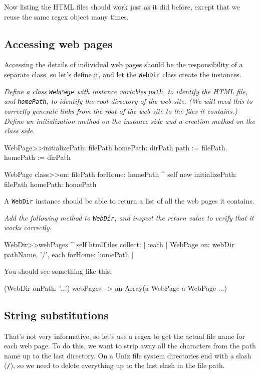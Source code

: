 \documentclass[10pt,twoside,chapterprefix=false]{scrbook}
\newcommand{\highlight}[1]{\textcolor{blue!65}{#1}}
\newcommand{\MarginLabel}[1]{%
	\marginnote{\textbf{#1}}}
\newcommand{\vartriangleout}{\ifthenelse{\isodd{\thepage}}{\vartriangleright}{\vartriangleleft}}
\renewcommand{\dothis}[1]{%
	\noindent\par\noindent
	{\reversemarginpar
		\marginnote{\fcolorbox{blue!65}{white}{\highlight{$\vartriangleout$}}}}
	\noindent\emph{#1}
	\nopagebreak}
\renewcommand{\ct}{\lstinline[mathescape=false,basicstyle={\sffamily\upshape}]}
\begin{document}
Now listing the HTML files should work just as it did before, except
that we reuse the same regex object many times.

\subsection{Accessing web pages}

Accessing the details of individual web pages should be the
responsibility of a separate class, so let's define it, and let the
\ct{WebDir} class create the instances.

\dothis{Define a class \ct{WebPage} with instance variables \ct{path},
to identify the HTML file, and \ct{homePath}, to identify the root
directory of the web site.  (We will need this to correctly generate
links from the root of the web site to the files it contains.) Define an
initialization method on the instance side and a creation method on the
class side.}

\begin{ToSh-code}{}
WebPage>>initializePath: filePath homePath: dirPath 
	path := filePath.
	homePath := dirPath

WebPage class>>on: filePath forHome: homePath
	^ self new initializePath: filePath homePath: homePath
\end{ToSh-code}

A \ct{WebDir} instance should be able to return a list of all the web pages it contains.
\dothis{Add the following method to \ct{WebDir}, and inspect the return
value to verify that it works correctly.}

\begin{ToSh-code}{}
WebDir>>webPages
	^ self htmlFiles collect: 
		[ :each | WebPage 
			on: webDir pathName, '/', each
			forHome: homePath ]
\end{ToSh-code}

You should see something like this:

\begin{ToSh-code}{}
(WebDir onPath: '...') webPages --> an Array(a WebPage a WebPage ...)
\end{ToSh-code}

\subsection{String substitutions}

That's not very informative, so let's use a regex to get the actual file
name for each web page. To do this, we want to strip away all the
characters from the path name up to the last directory. On a Unix file
system directories end with a slash (\ct{/}), so we need to delete
everything up to the last slash in the file path.
\end{document}
